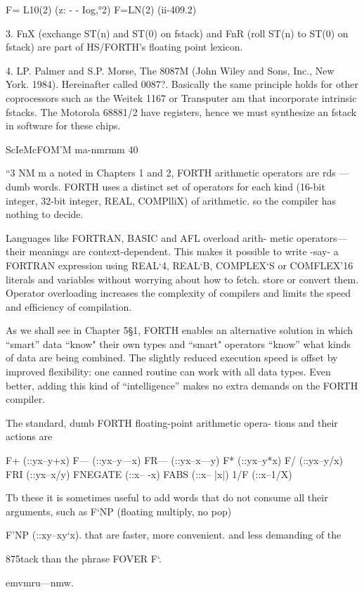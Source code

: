F= L10(2) (z: - - Iog,°2)
F=LN(2) (ii-409.2)

 

3. FnX (exchange ST(n) and ST(0) on fstack) and FnR (roll ST(n) to ST(0) on fstack) are part of
HS/FORTH’s ﬂoating point lexicon.

4. LP. Palmer and S.P. Morse, The 8087M (John Wiley and Sons, Inc., New York. 1984).
Hereinafter called 0087?. Basically the same principle holds for other coprocessors such as
the Weitek 1167 or Transputer am that incorporate intrinsic fstacks. The Motorola 68881/2 have
registers, hence we must synthesize an fstack in software for these chips.

ScIeMcFOM'M ma-nmrmm 40

“3 NM m
a noted in Chapters 1 and 2, FORTH arithmetic operators are
rds —dumb words. FORTH uses a distinct set of operators
for each kind (16-bit integer, 32-bit integer, REAL, COMPlliX)
of arithmetic. so the compiler has nothing to decide.

Languages like FORTRAN, BASIC and AFL overload arith-
metic operators—their meanings are context-dependent. This
makes it possible to write -say- a FORTRAN expression using
REAL‘4, REAL‘B, COMPLEX‘S or COMFLEX’16 literals
and variables without worrying about how to fetch. store or
convert them. Operator overloading increases the complexity of
compilers and limits the speed and efﬁciency of compilation.

As we shall see in Chapter 5§1, FORTH enables an alternative
solution in which “smart” data “know" their own types and
“smart" operators “know” what kinds of data are being combined.
The slightly reduced execution speed is offset by improved
ﬂexibility: one canned routine can work with all data types. Even
better, adding this kind of “intelligence” makes no extra demands
on the FORTH compiler.

The standard, dumb FORTH ﬂoating-point arithmetic opera-
tions and their actions are

F+ (::yx--y+x)
F— (::yx--y—x)
FR— (::yx--x—y)
F* (::yx--y*x)
F/ (::yx--y/x)
FRI (::yx--x/y)
FNEGATE (::x-- -x)
FABS (::x-- |x|)
1/F (::x--1/X)

Tb these it is sometimes useful to add words that do not consume
all their arguments, such as F‘NP (ﬂoating multiply, no pop)

F'NP (::xy--xy‘x).
that are faster, more convenient. and less demanding of the

875tack than the phrase FOVER F‘.

emvmru—nmw.

